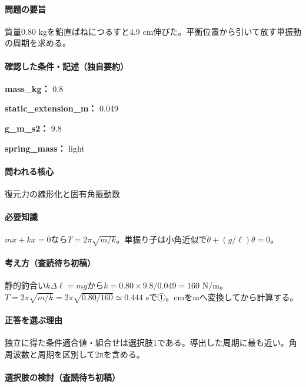 \paragraph{問題の要旨} 質量0.80 kgを鉛直ばねにつるすと4.9 cm伸びた。平衡位置から引いて放す単振動の周期を求める。

\paragraph{確認した条件・記述（独自要約）}\mbox{}\par

\noindent\textbf{mass\_kg：} 0.8\par

\noindent\textbf{static\_extension\_m：} 0.049\par

\noindent\textbf{g\_m\_s2：} 9.8\par

\noindent\textbf{spring\_mass：} light\par

\paragraph{問われる核心} 復元力の線形化と固有角振動数

\paragraph{必要知識} \(m\ddot x+kx=0\)なら\(T=2\pi\sqrt{m/k}\)。単振り子は小角近似で\(\ddot\theta+(g/\ell)\theta=0\)。

\paragraph{考え方（査読待ち初稿）} 静的釣合い\(k\Delta\ell=mg\)から\(k=0.80\times9.8/0.049=160\) N/m。\(T=2\pi\sqrt{m/k}=2\pi\sqrt{0.80/160}\simeq0.444\) sで①。cmをmへ変換してから計算する。

\paragraph{正答を選ぶ理由} 独立に得た条件適合値・組合せは選択肢1である。導出した周期に最も近い。角周波数と周期を区別して2πを含める。

\paragraph{選択肢の検討（査読待ち初稿）}\mbox{}\par

